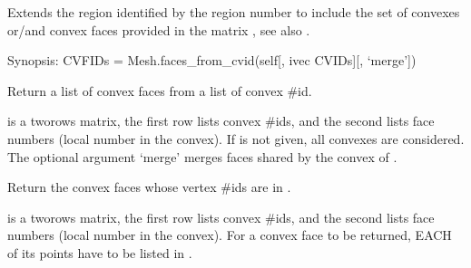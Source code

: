 \documentclass[a4paper,11pt,english]{sphinxmanual}
\begin{document}
\begin{fulllineitems}

\begin{fulllineitems}
\label{\detokenize{python/cmdref_Mesh:getfem.Mesh.extend_region}}
Extends the region identified by the region number  to include
the set of convexes or/and convex faces provided in the matrix
, see also .

\end{fulllineitems}


\begin{fulllineitems}
\label{\detokenize{python/cmdref_Mesh:getfem.Mesh.faces_from_cvid}}
Synopsis: CVFIDs = Mesh.faces\_from\_cvid(self{[}, ivec CVIDs{]}{[}, ‘merge’{]})

Return a list of convex faces from a list of convex \#id.

 is a two\sphinxhyphen{}rows matrix, the first row lists convex \#ids,
and the second lists face numbers (local number in the convex).
If  is not given, all convexes are considered. The optional
argument ‘merge’ merges faces shared by the convex of .

\end{fulllineitems}


\begin{fulllineitems}
\label{\detokenize{python/cmdref_Mesh:getfem.Mesh.faces_from_pid}}
Return the convex faces whose vertex \#ids are in .

 is a two\sphinxhyphen{}rows matrix, the first row lists convex \#ids,
and the second lists face numbers (local number in the convex).
For a convex face to be returned, EACH of its points have to be
listed in .


\end{fulllineitems}
\end{fulllineitems}
\end{document}
